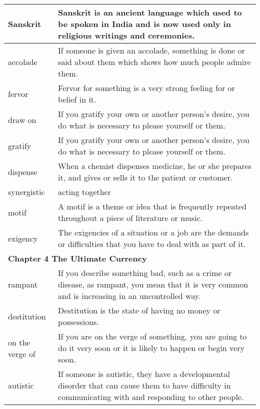 \documentclass{article}
\begin{document}
\begin{center}
\begin{longtable}{|l|p{7.8cm}|}
\hline
Sanskrit
&
Sanskrit is an ancient language which used to be spoken in India and is now used only in religious writings and ceremonies.
\\

\hline
accolade
&
If someone is given an accolade, something is done or said about them which shows how much people admire them.
\\

\hline
fervor
&
Fervor for something is a very strong feeling for or belief in it.
\\

\hline
draw on
&
If you gratify your own or another person's desire, you do what is necessary to please yourself or them.
\\

\hline
gratify
&
If you gratify your own or another person's desire, you do what is necessary to please yourself or them.
\\

\hline
dispense
&
When a chemist dispenses medicine, he or she prepares it, and gives or sells it to the patient or customer.
\\

\hline
synergistic
&
acting together
\\

\hline
motif
&
A motif is a theme or idea that is frequently repeated throughout a piece of literature or music.
\\

\hline
exigency
&
The exigencies of a situation or a job are the demands or difficulties that you have to deal with as part of it.
\\

\hline
\multicolumn{2}{|l|}{\textbf{Chapter 4 The Ultimate Currency}}\\
\hline
rampant
&
If you describe something bad, such as a crime or disease, as rampant, you mean that it is very common and is increasing in an uncontrolled way.
\\

\hline
destitution
&
Destitution is the state of having no money or possessions.
\\

\hline
on the verge of
&
If you are on the verge of something, you are going to do it very soon or it is likely to happen or begin very soon.
\\

\hline
autistic
&
If someone is autistic, they have a developmental disorder that can cause them to have difficulty in communicating with and responding to other people.
\\


\end{longtable}
\end{center}
\end{document}
